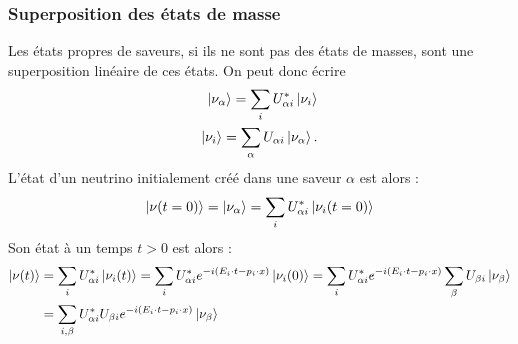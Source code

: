             \subsubsection{Superposition des états de masse}
            Les états propres de saveurs, si ils ne sont pas des états de masses, sont une superposition linéaire de ces états. On peut donc écrire
            \begin{eqnarray}
            \ket{\nu_{\alpha}} = \sum_i U_{\alpha i}^*\ket{\nu_i} \label{eq::alphatoi} \\
            \ket{\nu_i} = \sum_{\alpha} U_{\alpha i}\ket{\nu_{\alpha}}.
            \end{eqnarray}
            L'état d'un neutrino initialement créé dans une saveur $\alpha$ est alors :
            \begin{equation}
            	\ket{\nu(t=0)} = \ket{\nu_{\alpha}} = \sum_i U_{\alpha i}^*\ket{\nu_i(t=0)}
            \end{equation}
            Son état à un temps $t > 0$ est alors :
            \begin{equation}\label{eq::0tot}
	            \begin{split}
	            	\ket{\nu(t)} &=\sum_{i} U_{\alpha i}^*\ket{\nu_i(t)} = \sum_{i} U_{\alpha i}^* e^{-i(E_i\cdot t - p_i\cdot x)}\ket{\nu_i(0)} = \sum_{i} U_{\alpha i}^* e^{-i(E_i\cdot t - p_i\cdot x)}\sum_{\beta}U_{\beta i}\ket{\nu_{\beta}}\\ & = \sum_{i,\beta} U_{\alpha i}^*U_{\beta i} e^{-i(E_i\cdot t - p_i\cdot x)}\ket{\nu_{\beta}}
            	\end{split}
            \end{equation}
            
